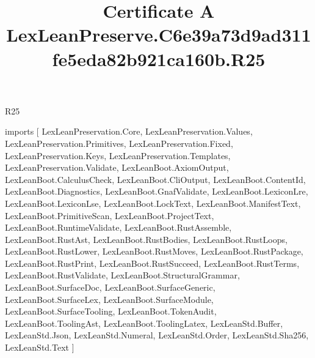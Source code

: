 \begin{lexlean}{R25}
\title{Certificate A LexLeanPreserve.C6e39a73d9ad311fe5eda82b921ca160b.R25}
\begin{coremodule}
imports [
  LexLeanPreservation.Core,
  LexLeanPreservation.Values,
  LexLeanPreservation.Primitives,
  LexLeanPreservation.Fixed,
  LexLeanPreservation.Keys,
  LexLeanPreservation.Templates,
  LexLeanPreservation.Validate,
  LexLeanBoot.AxiomOutput,
  LexLeanBoot.CalculusCheck,
  LexLeanBoot.CliOutput,
  LexLeanBoot.ContentId,
  LexLeanBoot.Diagnostics,
  LexLeanBoot.GnafValidate,
  LexLeanBoot.LexiconLre,
  LexLeanBoot.LexiconLse,
  LexLeanBoot.LockText,
  LexLeanBoot.ManifestText,
  LexLeanBoot.PrimitiveScan,
  LexLeanBoot.ProjectText,
  LexLeanBoot.RuntimeValidate,
  LexLeanBoot.RustAssemble,
  LexLeanBoot.RustAst,
  LexLeanBoot.RustBodies,
  LexLeanBoot.RustLoops,
  LexLeanBoot.RustLower,
  LexLeanBoot.RustMoves,
  LexLeanBoot.RustPackage,
  LexLeanBoot.RustPrint,
  LexLeanBoot.RustSucceed,
  LexLeanBoot.RustTerms,
  LexLeanBoot.RustValidate,
  LexLeanBoot.StructuralGrammar,
  LexLeanBoot.SurfaceDoc,
  LexLeanBoot.SurfaceGeneric,
  LexLeanBoot.SurfaceLex,
  LexLeanBoot.SurfaceModule,
  LexLeanBoot.SurfaceTooling,
  LexLeanBoot.TokenAudit,
  LexLeanBoot.ToolingAst,
  LexLeanBoot.ToolingLatex,
  LexLeanStd.Buffer,
  LexLeanStd.Json,
  LexLeanStd.Numeral,
  LexLeanStd.Order,
  LexLeanStd.Sha256,
  LexLeanStd.Text
]


\end{coremodule}
\end{lexlean}
